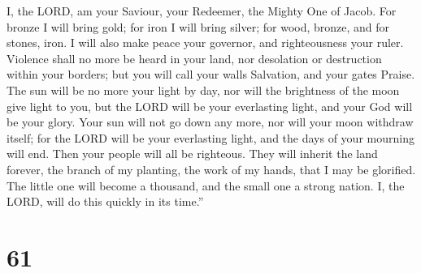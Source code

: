 I, the LORD, am your Saviour, your Redeemer, the Mighty One of Jacob.
 For bronze I will bring gold; for iron I will bring
silver; for wood, bronze, and for stones, iron. I will also make peace
your governor, and righteousness your ruler.  Violence
shall no more be heard in your land, nor desolation or destruction
within your borders; but you will call your walls Salvation, and your
gates Praise.  The sun will be no more your light by day,
nor will the brightness of the moon give light to you, but the LORD will
be your everlasting light, and your God will be your glory.
 Your sun will not go down any more, nor will your moon
withdraw itself; for the LORD will be your everlasting light, and the
days of your mourning will end.  Then your people will all
be righteous. They will inherit the land forever, the branch of my
planting, the work of my hands, that I may be glorified. 
The little one will become a thousand, and the small one a strong
nation. I, the LORD, will do this quickly in its time.''

\hypertarget{section-58}{%
\section{61}\label{section-58}}

